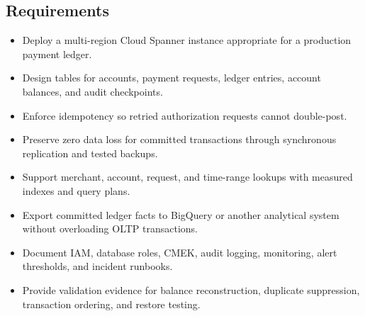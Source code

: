 \subsection*{Requirements}
\begin{itemize}
    \item Deploy a multi-region Cloud Spanner instance appropriate for a production payment ledger.
    \item Design tables for accounts, payment requests, ledger entries, account balances, and audit checkpoints.
    \item Enforce idempotency so retried authorization requests cannot double-post.
    \item Preserve zero data loss for committed transactions through synchronous replication and tested backups.
    \item Support merchant, account, request, and time-range lookups with measured indexes and query plans.
    \item Export committed ledger facts to BigQuery or another analytical system without overloading OLTP transactions.
    \item Document IAM, database roles, CMEK, audit logging, monitoring, alert thresholds, and incident runbooks.
    \item Provide validation evidence for balance reconstruction, duplicate suppression, transaction ordering, and restore testing.
\end{itemize}

